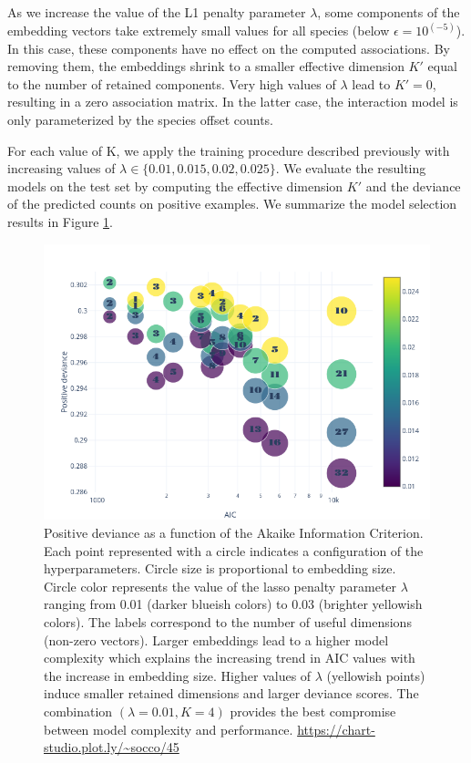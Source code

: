 \documentclass[]{article}
\newcommand{\commG}[1]{#1}
\begin{document}
As we increase the value of the L1 penalty parameter $\lambda$, some components of the embedding vectors take extremely small values for all species (below $\epsilon=10^(-5)$). In this case, these components have no effect on the computed associations. By removing them, the embeddings shrink to a smaller effective dimension $K'$ equal to the number of retained components. Very high values of $\lambda$ lead to $K'=0$, resulting in a zero association matrix. In the latter case, the interaction model is only parameterized by the species offset counts.

For each value of K, we apply the training procedure described previously with increasing values of $\lambda \in \{0.01,0.015,0.02,0.025\}$. We evaluate the resulting models on the test set by computing the effective dimension $K'$ and the deviance of the predicted counts on positive examples. We summarize the model selection results in Figure \ref{gridaravo}.

\begin{figure}[H]
	\centering
	\commG{\includegraphics[scale=0.5]{gridaravo}}
	\caption{Positive deviance as a function of the Akaike Information Criterion. Each point represented with a circle indicates a configuration of the hyperparameters. Circle size is proportional to embedding size. Circle color represents the value of the lasso penalty parameter $\lambda$ ranging from 0.01 (darker blueish colors) to 0.03 (brighter yellowish colors). The labels correspond to the number of useful dimensions (non-zero vectors). Larger embeddings lead to a higher model complexity which explains the increasing trend in AIC values with the increase in embedding size. Higher values of $\lambda$ (yellowish points) induce smaller retained dimensions and larger deviance scores. The combination $(\lambda=0.01,K=4)$ provides the best compromise between model complexity and performance.  \url{https://chart-studio.plot.ly/~socco/45}}
	\label{gridaravo}
\end{figure}
\end{document}
